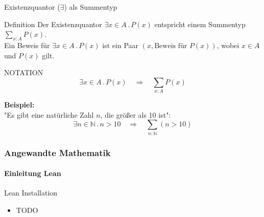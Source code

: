 \documentclass{beamer}
\begin{document}
\begin{frame}{Existenzquantor (\(\exists\)) als Summentyp}
    \begin{block}{Definition}
        Der Existenzquantor \( \exists x \in A \, . \, P(x) \) entspricht einem Summentyp \( \sum_{x : A} P(x) \). \\
        Ein Beweis für \( \exists x \in A \, . \, P(x) \) ist ein Paar \((x, \text{Beweis für } P(x))\), wobei \( x \in A \) und \( P(x) \) gilt.
    \end{block}

    \begin{block}{NOTATION}
        \[
        \exists x \in A \, . \, P(x) \quad \Rightarrow \quad \sum_{x : A} P(x)
        \]
    \end{block}

    \textbf{Beispiel:} \\
    "Es gibt eine natürliche Zahl \( n \), die größer als 10 ist":
    \[
    \exists n \in \mathbb{N} \, . \, n > 10 \quad \Rightarrow \quad \sum_{n : \mathbb{N}} (n > 10)
    \]
\end{frame}


\begin{frame}
    \frametitle{Angewandte Mathematik}
\framesubtitle{Einleitung Lean}
    \begin{block}{Lean Installation}
        \begin{itemize}
            \item TODO
        \end{itemize}
    \end{block}
 \end{frame}
\end{document}
